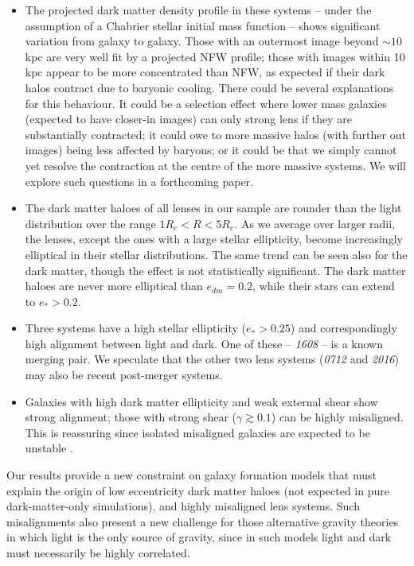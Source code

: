 \documentclass[useAMS,usenatbib]{mn2e}
\begin{document}
\begin{itemize}
\item The projected dark matter density profile in these systems -- under the assumption of a Chabrier stellar initial mass function -- shows significant variation from galaxy to galaxy. Those with an outermost image beyond $\sim 10$\,kpc are very well fit by a projected NFW profile; those with images within 10\,kpc appear to be more concentrated than NFW, as expected if their dark halos contract due to baryonic cooling. There could be several explanations for this behaviour. It could be a selection effect where lower mass galaxies (expected to have closer-in images) can only strong lens if they are substantially contracted; it could owe to more massive halos (with further out images) being less affected by baryons; or it could be that we simply cannot yet resolve the contraction at the centre of the more massive systems. We will explore such questions in a forthcoming paper.

\item The dark matter haloes of all lenses in our sample are rounder than the light distribution over the range $1R_e < R < 5R_e$. As we average over larger radii, the lenses, except the ones with a large stellar ellipticity, become increasingly elliptical in their stellar distributions. The same trend can be seen also for the dark matter, though the effect is not statistically significant. The dark matter haloes are never more elliptical than $e_{dm} = 0.2$, while their stars can extend to $e_* > 0.2$.

\item Three systems have a high stellar ellipticity ($e_* > 0.25$) and correspondingly high alignment between light and dark. One of these -- {\it1608} -- is a known merging pair. We speculate that the other two lens systems ({\it0712} and {\it2016}) may also be recent post-merger systems. 

\item Galaxies with high dark matter ellipticity and weak external shear show strong alignment; those with strong shear ($\gamma \gtrsim 0.1$) can be highly misaligned. This is reassuring since isolated misaligned galaxies are expected to be unstable \citep[e.g.][]{1979ApJ...233..872H,1988A&A...206..269M,2007ApJ...670.1027A,2015arXiv150203429D}.

\end{itemize}

Our results provide a new constraint on galaxy formation models that must explain the origin of low eccentricity dark matter haloes (not expected in pure dark-matter-only simulations), and highly misaligned lens systems. Such misalignments also present a new challenge for those alternative gravity theories in which light is the only source of gravity, since in such models light and dark must necessarily be highly correlated.
\end{document}
